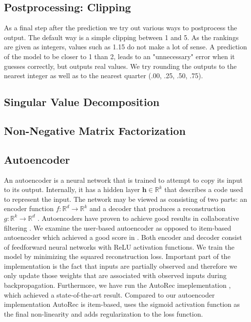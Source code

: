 \documentclass[10pt,conference,compsocconf]{IEEEtran}
\begin{document}
    \subsection{Postprocessing: Clipping}
    As a final step after the prediction we try out various ways to postprocess the output.
    The default way is a simple clipping between 1 and 5.
    As the rankings are given as integers, values such as 1.15 do not make a lot of sense.
    A prediction of the model to be closer to 1 than 2, leads to an "unnecessary" error when it guesses correctly, but outputs real values.
    We try rounding the outputs to the nearest integer as well as to the nearest quarter (.00, .25, .50, .75).

    \subsection{Singular Value Decomposition}

    \subsection{Non-Negative Matrix Factorization}

    \subsection{Autoencoder}
    An autoencoder is a neural network that is trained to attempt to copy its input to its output.
    Internally, it has a hidden layer $\textbf{h} \in \mathbb{R}^k$ that describes a code used to represent the input.
    The network may be viewed as consisting of two parts: an encoder function $f: \mathbb{R} ^d \rightarrow \mathbb{R} ^k$ and a
    decoder that produces a reconstruction $g: \mathbb{R} ^k \rightarrow \mathbb{R} ^d$ \cite{Goodfellow-et-al-2016}. Autoencoders
    have proven to achieve good results in collaborative filtering \cite{inproceedings}. We examine the user-based
    autoencoder as opposed to item-based autoencoder which achieved a good score in \cite{inproceedings}. Both encoder
    and decoder consist of feedforward neural networks with ReLU activation functions. We train the model by minimizing
    the squared reconstruction loss. Important part of the implementation is the fact that inputs are partially observed
    and therefore we only update those weights that are associated with observed inputs during backpropagation. Furthermore, we have run the AutoRec imeplementation \cite{inproceedings}, which achieved a state-of-the-art result. Compared to our autoencoder implementation AutoRec is item-based, uses the sigmoid activation function as the final non-linearity and adds regularization to the loss function. 
    
\end{document}

